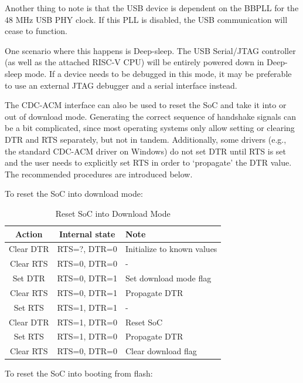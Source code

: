 \documentclass[main\_\_EN.tex]{subfiles}
\begin{document}
Another thing to note is that the USB device is dependent on the BBPLL for the 48 MHz USB PHY clock. If this PLL is disabled, the USB communication will cease to function.

One scenario where this happens is Deep-sleep. The USB Serial/JTAG controller (as well as the attached RISC-V CPU) will be entirely powered down in Deep-sleep mode. If a device needs to be debugged in this mode, it may be preferable to use an external JTAG debugger and a serial interface instead.

The CDC-ACM interface can also be used to reset the SoC and take it into or out of download mode. Generating the correct sequence of handshake signals can be a bit complicated, since most operating systems only allow setting or clearing DTR and RTS separately, but not in tandem. Additionally, some drivers (e.g., the standard CDC-ACM driver on Windows) do not set DTR until RTS is set and the user needs to explicitly set RTS in order to `propagate' the DTR value. The recommended procedures are introduced below.

To reset the SoC into download mode:

\begin{table}[H]
    \centering
    \caption{Reset SoC into Download Mode}
    \label{tab:usbserialjtag-reset-soc-into-download-mode}
    \begin{tabular} {|c|c|l|}
    \hline
        \rowcolor{lightgray}
        \textbf{Action} & \textbf{Internal state} & \textbf{Note} \\\hline

        Clear DTR & RTS=?, DTR=0 & Initialize to known values \\\hline
        Clear RTS & RTS=0, DTR=0 & - \\\hline
        Set DTR & RTS=0, DTR=1 & Set download mode flag \\\hline
        Clear RTS & RTS=0, DTR=1 & Propagate DTR \\\hline
        Set RTS & RTS=1, DTR=1 & - \\\hline
        Clear DTR & RTS=1, DTR=0 & Reset SoC \\\hline
        Set RTS & RTS=1, DTR=0 & Propagate DTR \\\hline
        Clear RTS & RTS=0, DTR=0 & Clear download flag\\\hline
    \end{tabular}
\end{table}

To reset the SoC into booting from flash:
\end{document}
